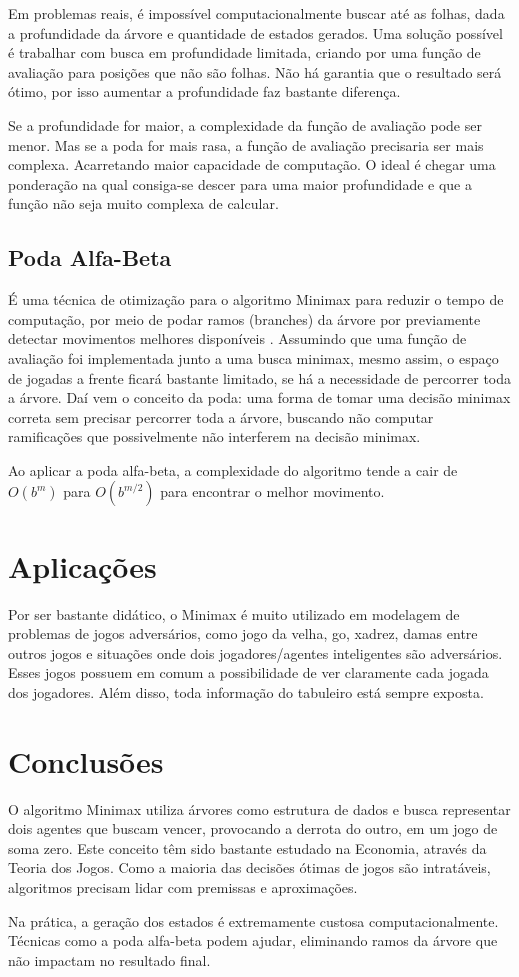 \documentclass[sigplan,screen]{acmart}
\begin{document}
Em problemas reais, é impossível computacionalmente buscar até as folhas, dada a profundidade da árvore e quantidade de estados gerados.
Uma solução possível é trabalhar com busca em profundidade limitada, criando por uma função de avaliação para posições que não são folhas.
Não há garantia que o resultado será ótimo, por isso aumentar a profundidade faz bastante diferença.

Se a profundidade for maior, a complexidade da função de avaliação pode ser menor. Mas se a poda for mais rasa, a função de avaliação precisaria ser mais complexa. 
Acarretando maior capacidade de computação. 
O ideal é chegar uma ponderação na qual consiga-se descer para uma maior profundidade e que a função não seja muito complexa de calcular.

\subsection{Poda Alfa-Beta}
É uma técnica de otimização para o algoritmo Minimax para reduzir o tempo de computação, por meio de podar ramos (branches) da árvore por previamente detectar movimentos melhores disponíveis \cite{Aradhya04}.
Assumindo que uma função de avaliação foi implementada junto a uma busca minimax, mesmo assim, o espaço de jogadas a frente ficará bastante limitado, se há a necessidade de percorrer toda a árvore.
Daí vem o conceito da poda: uma forma de tomar uma decisão minimax correta sem precisar percorrer toda a árvore, buscando não computar ramificações que possivelmente não interferem na decisão minimax.

Ao aplicar a poda alfa-beta, a complexidade do algoritmo tende a cair de $O(b^m)$ para $O(b^{m/2})$ para encontrar o melhor movimento.


\section{Aplicações}
Por ser bastante didático, o Minimax é muito utilizado em modelagem de problemas de jogos adversários, como jogo da velha, go, xadrez, damas entre outros jogos e situações onde dois jogadores/agentes inteligentes são adversários.
Esses jogos possuem em comum a possibilidade de ver claramente cada jogada dos jogadores. Além disso, toda informação do tabuleiro está sempre exposta.

\section{Conclusões}
O algoritmo Minimax utiliza árvores como estrutura de dados e busca representar dois agentes que buscam vencer, provocando a derrota do outro, em um jogo de soma zero. 
Este conceito têm sido bastante estudado na Economia, através da Teoria dos Jogos. 
Como a maioria das decisões ótimas de jogos são intratáveis, algoritmos precisam lidar com premissas e aproximações.

Na prática, a geração dos estados é extremamente custosa computacionalmente. Técnicas como a poda alfa-beta podem ajudar, eliminando ramos da árvore que não impactam no resultado final.



\end{document}
